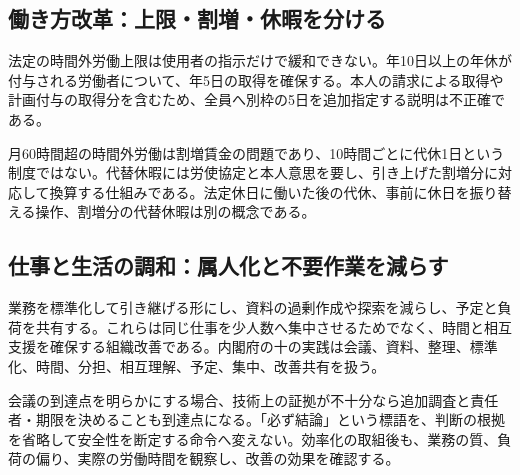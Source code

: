 \subsection{働き方改革：上限・割増・休暇を分ける}
\label{theory:employment:reform}
法定の時間外労働上限は使用者の指示だけで緩和できない。年10日以上の年休が付与される労働者について、年5日の取得を確保する。本人の請求による取得や計画付与の取得分を含むため、全員へ別枠の5日を追加指定する説明は不正確である\parencite{employment_paidleave}。

月60時間超の時間外労働は割増賃金の問題であり、10時間ごとに代休1日という制度ではない。代替休暇には労使協定と本人意思を要し、引き上げた割増分に対応して換算する仕組みである\parencite{employment_alternative2008}。法定休日に働いた後の代休、事前に休日を振り替える操作、割増分の代替休暇は別の概念である。

\subsection{仕事と生活の調和：属人化と不要作業を減らす}
\label{theory:employment:worklife}
業務を標準化して引き継げる形にし、資料の過剰作成や探索を減らし、予定と負荷を共有する。これらは同じ仕事を少人数へ集中させるためでなく、時間と相互支援を確保する組織改善である。内閣府の十の実践は会議、資料、整理、標準化、時間、分担、相互理解、予定、集中、改善共有を扱う\parencite{employment_worklife2010}。

会議の到達点を明らかにする場合、技術上の証拠が不十分なら追加調査と責任者・期限を決めることも到達点になる。「必ず結論」という標語を、判断の根拠を省略して安全性を断定する命令へ変えない。効率化の取組後も、業務の質、負荷の偏り、実際の労働時間を観察し、改善の効果を確認する。
